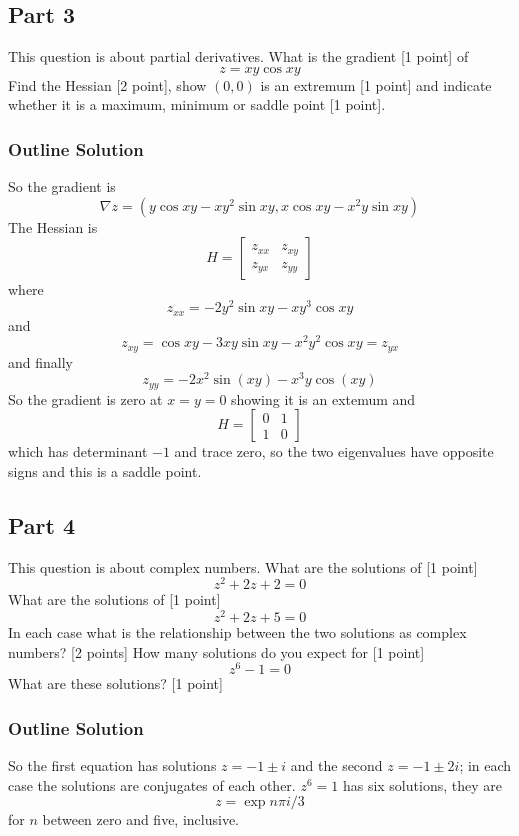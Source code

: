 \documentclass[11pt,a4paper]{scrartcl}
\begin{document}
      \subsection*{Part 3}
      This question is about partial derivatives. What is the gradient [1 point] of
      $$
      z=xy\cos{xy}
      $$
      Find the Hessian [2 point], show $(0,0)$ is an extremum [1 point] and indicate whether it is a maximum, minimum or saddle point [1 point].

      \subsubsection{Outline Solution}
      So the gradient is
      $$\nabla z=\left(y\cos{xy}-xy^2\sin{xy},x\cos{xy}-x^2y\sin{xy}\right)$$
      The Hessian is
      $$H=\left[\begin{array}{cc}z_{xx}&z_{xy}\\z_{yx}&z_{yy}\end{array}\right]$$
      where
      $$z_{xx} = -2y^2\sin{xy}-xy^3\cos{xy}$$
      and
      $$z_{xy} = \cos{xy}-3xy\sin{xy}-x^2y^2\cos{xy}=z_{yx}$$
      and finally
$$z_{yy}= -2x^2\sin(xy) - x^3y\cos(xy)$$
      So the gradient is zero at $x=y=0$ showing it is an extemum and
      $$H=\left[\begin{array}{cc}0&1\\1&0\end{array}\right]$$
      which has determinant $-1$ and trace zero, so the two eigenvalues have opposite signs and this is a saddle point.

      \subsection*{Part 4}
      This question is about complex numbers. What are the solutions of [1 point]
      $$z^2+2z+2=0$$
      What are the solutions of [1 point]
      $$z^2+2z+5=0$$
      In each case what is the relationship between the two solutions as complex numbers? [2 points]
      How many solutions do you expect for [1 point]
      $$z^{6}-1=0$$
      What are these solutions? [1 point]

      \subsubsection*{Outline Solution}
      So the first equation has solutions $z=-1\pm i$ and the second $z=-1\pm 2i$; in each case the solutions are conjugates of each other. $z^6=1$ has six solutions, they are
      \begin{equation}
        z=\exp{n\pi i/3}
      \end{equation}
      for $n$ between zero and five, inclusive.
\end{document}
